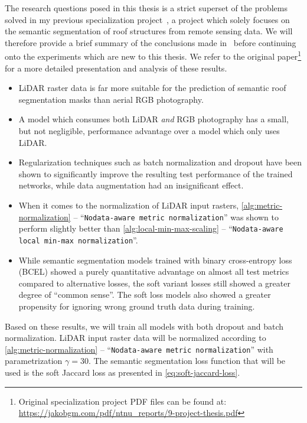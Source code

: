 The research questions posed in this thesis is a strict superset of the problems solved in my previous specialization project~\cite{specialization-project}, a project which solely focuses on the semantic segmentation of roof structures from remote sensing data.
We will therefore provide a brief summary of the conclusions made in~\cite{specialization-project} before continuing onto the experiments which are new to this thesis.
We refer to the original paper\footnote{Original specialization project PDF files can be found at: \url{https://jakobgm.com/pdf/ntnu_reports/9-project-thesis.pdf}} for a more detailed presentation and analysis of these results.
%
\begin{itemize}
  \item LiDAR raster data is far more suitable for the prediction of semantic roof segmentation masks than aerial RGB photography.
  \item A model which consumes both LiDAR \emph{and} RGB photography has a small, but not negligible, performance advantage over a model which only uses LiDAR.
  \item Regularization techniques such as batch normalization and dropout have been shown to significantly improve the resulting test performance of the trained networks, while data augmentation had an insignificant effect.
  \item When it comes to the normalization of LiDAR input rasters, \cref{alg:metric-normalization} -- \enquote{\texttt{Nodata-aware metric normalization}} was shown to perform slightly better than \cref{alg:local-min-max-scaling} -- \enquote{\texttt{Nodata-aware local min-max normalization}}.
  \item While semantic segmentation models trained with binary cross-entropy loss (BCEL) showed a purely quantitative advantage on almost all test metrics compared to alternative losses, the soft variant losses still showed a greater degree of \enquote{common sense}.
  The soft loss models also showed a greater propensity for ignoring wrong ground truth data during training.
\end{itemize}
%
Based on these results, we will train all models with both dropout and batch normalization.
LiDAR input raster data will be normalized according to \cref{alg:metric-normalization} -- \enquote{\texttt{Nodata-aware metric normalization}} with parametrization $\gamma = 30$.
The semantic segmentation loss function that will be used is the soft Jaccard loss as presented in \cref{eq:soft-jaccard-loss}.
